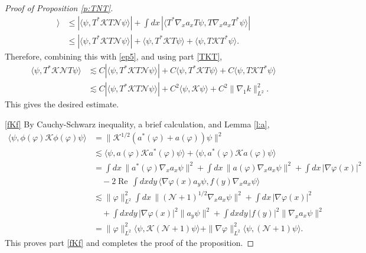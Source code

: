 \documentclass[11pt,a4paper]{scrartcl}
\newcommand{\N}{\mathcal{N}}
\newcommand{\K}{\mathcal{K}}
\renewcommand{\Re}{\operatorname{Re}\,} 	%
\begin{document}
\begin{proof}[Proof of Proposition \ref{p:TNT}]
\begin{align*}
    \rangle & \le |\langle \psi, T^* \K T \N \psi \rangle| + \int dx \,
    |\langle T^* \nabla_x a_x T \psi, T \nabla_x a_x T^* \psi \rangle| \\
    & \le |\langle \psi, T^* \K T \N \psi \rangle| + \langle \psi, T^* \K T
    \psi \rangle + \langle \psi, T \K T^* \psi \rangle.
  \end{align*}
  Therefore, combining this with \eqref{ep5}, and using part \eqref{TKT},
  \begin{align*}
    \langle \psi, T^* \K \N T \psi \rangle & \apprle C |\langle \psi, T^* \K T
    \N \psi \rangle| + C \langle \psi, T^* \K T \psi \rangle + C \langle
    \psi, T \K T^* \psi \rangle \\
    & \apprle C |\langle \psi, T^* \K T \N \psi \rangle| + C^2 \langle \psi,
    \K \psi \rangle + C^2 \| \nabla_1 k \|_{L^2}^2.
  \end{align*}
  This gives the desired estimate.


  \eqref{fKf} By Cauchy-Schwarz inequality, a brief calculation, and Lemma
  \ref{l:a},
  \begin{align*}
    \langle \psi, \phi(\varphi) \K \phi(\varphi) \psi \rangle & = \| \K^{1/2}
    (a^*(\varphi) + a(\varphi) ) \psi \|^2 \\
    & \apprle \langle \psi, a(\varphi) \K a^*(\varphi) \psi \rangle + \langle
    \psi, a^*(\varphi) \K a(\varphi) \psi \rangle \\
    & = \int dx \, \| a^*(\varphi) \nabla_x a_x \psi \|^2 + \int dx \, \|
    a(\varphi) \nabla_x a_x \psi \|^2 + \int dx \, |\nabla \varphi(x)|^2 \\
    & \quad - 2 \Re \int dx dy \, \langle \nabla \varphi(x) a_y \psi, f(y)
    \nabla_x a_x \psi \rangle \\
    & \apprle \| \varphi \|_{L^2}^2 \int dx \, \| (\N + 1)^{1/2} \nabla_x a_x
    \psi \|^2 + \int dx \, | \nabla \varphi(x) |^2 \\
    & \quad + \int dx dy \, | \nabla \varphi(x)|^2 \| a_y \psi \|^2 + \int dx
    dy \, |f(y)|^2 \| \nabla_x a_x \psi \|^2 \\
    & = \| \varphi \|_{L^2}^2 \langle \psi, \K (\N + 1) \psi \rangle + \|
    \nabla \varphi \|_{L^2}^2 \langle \psi, (\N + 1) \psi \rangle.
  \end{align*}
  This proves part \eqref{fKf} and completes the proof of the proposition.
\end{proof}
\end{document}

